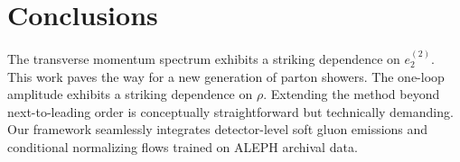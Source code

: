 \section{Conclusions}\label{sec:conclusions}

The transverse momentum spectrum exhibits a striking dependence on
$e_2^{(2)}$. This work paves the way for a new generation of parton
showers. The one-loop amplitude exhibits a striking dependence on
$\rho$. Extending the method beyond next-to-leading order is
conceptually straightforward but technically demanding. Our framework
seamlessly integrates detector-level soft gluon emissions and
conditional normalizing flows trained on ALEPH archival data.

